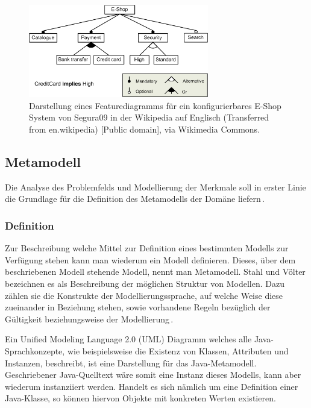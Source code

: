 \documentclass[12pt,oneside,a4paper,parskip]{scrbook}
\begin{document}
\begin{figure}[tbp]
\centering
\includegraphics[width=0.7\textwidth]{bilder/E-shopFM.jpg}
\caption{Darstellung eines Featurediagramms für ein konfigurierbares E-Shop System von Segura09 in der Wikipedia auf Englisch (Transferred from en.wikipedia) [Public domain], via Wikimedia Commons.}
\label{fig:fd}
\end{figure}

\subsection{Metamodell}

Die Analyse des Problemfelds und Modellierung der Merkmale soll in erster Linie die Grundlage für die Definition des Metamodells der Domäne liefern\,\cite[S. 200]{stahl2007}. 

\subsubsection{Definition}

Zur Beschreibung welche Mittel zur Definition eines bestimmten Modells zur Verfügung stehen kann man wiederum ein Modell definieren. Dieses, über dem beschriebenen Modell stehende Modell, nennt man Metamodell. Stahl und Völter bezeichnen es als Beschreibung der möglichen Struktur von Modellen. Dazu zählen sie die Konstrukte der Modellierungssprache, auf welche Weise diese zueinander in Beziehung stehen, sowie vorhandene Regeln bezüglich der Gültigkeit beziehungsweise der Modellierung\,\cite[S. 59]{stahl2007}.

Ein Unified Modeling Language 2.0 (UML) Diagramm welches alle Java-Sprachkonzepte, wie beispielsweise die Existenz von Klassen, Attributen und Instanzen, beschreibt, ist eine Darstellung für das Java-Metamodell. Geschriebener Java-Quelltext wäre somit eine Instanz dieses Modells, kann aber wiederum instanziiert werden. Handelt es sich nämlich um eine Definition einer Java-Klasse, so können hiervon Objekte mit konkreten Werten existieren.
\end{document}
